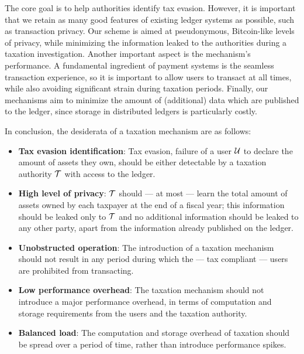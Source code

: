 The core goal is to help authorities identify tax
evasion. However, it is important that we retain as many good features of
existing ledger systems as possible, such as transaction privacy. Our scheme is
aimed at pseudonymous, Bitcoin-like levels of privacy, while minimizing the
information leaked to the authorities during a taxation investigation.  Another
important aspect is the mechanism's performance. A fundamental ingredient of
payment systems is the seamless transaction experience, so it is important to
allow users to transact at all times, while also avoiding significant strain
during taxation periods. Finally, our mechanisms aim to minimize the amount of
(additional) data which are published to the ledger, since storage in
distributed ledgers is particularly costly.

In conclusion, the desiderata of a taxation mechanism are as follows:
\begin{itemize}
    \item \textbf{Tax evasion identification}: Tax evasion, \ie failure of a
        user $\mathcal{U}$ to declare the amount of assets they own, should be either
        detectable by a taxation authority $\mathcal{T}$ with access to the
        ledger.
    \item \textbf{High level of privacy}: $\mathcal{T}$ should --- at most ---
        learn the total amount of assets owned by each taxpayer at the end of a
        fiscal year; this information should be leaked only to $\mathcal{T}$ and
        no additional information should be leaked to any other party, apart
        from the information already published on the ledger.
    \item \textbf{Unobstructed operation}: The introduction of a taxation
        mechanism should not result in any period during which the --- tax
        compliant --- users are prohibited from transacting.
    \item \textbf{Low performance overhead}: The taxation mechanism should not
        introduce a major performance overhead, in terms of computation and
        storage requirements from the users and the taxation authority.
    \item \textbf{Balanced load}: The computation and storage overhead of
        taxation should be spread over a period of time, rather than introduce
        performance spikes.
\end{itemize}
